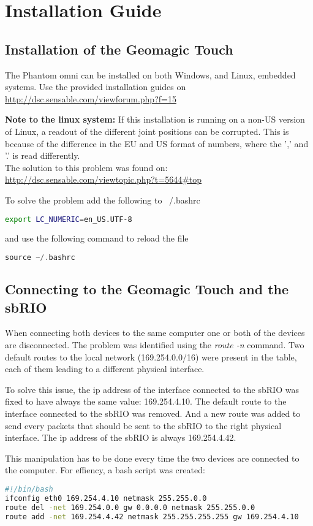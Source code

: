 \chapter{Installation Guide}

\section{Installation of the Geomagic Touch}
The Phantom omni can be installed on both Windows, and Linux, embedded systems. 
Use the provided installation guides on\\
\url{http://dsc.sensable.com/viewforum.php?f=15}

\textbf{Note to the linux system:} If this installation is running on a non-US version of Linux, a readout of the different joint positions can be corrupted. This is because of the difference in the EU and US format of numbers, where the ',' and '.' is read differently.\\
The solution to this problem was found on:\\
\url{http://dsc.sensable.com/viewtopic.php?t=5644#top}

To solve the problem add the following to ~/.bashrc
\begin{lstlisting}[language=bash]
export LC_NUMERIC=en_US.UTF-8
\end{lstlisting}
and use the following command to reload the file
\begin{lstlisting}[language=C]
source ~/.bashrc
\end{lstlisting}

\section{Connecting to the Geomagic Touch and the sbRIO}

When connecting both devices to the same computer one or both of the devices are disconnected. The problem was identified using the \textit{route -n} command. Two default routes to the local network (169.254.0.0/16) were present in the table, each of them leading to a different physical interface.

To solve this issue, the ip address of the interface connected to the sbRIO was fixed to have always the same value: 169.254.4.10. The default route to the interface connected to the sbRIO was removed. And a new route was added to send every packets that should be sent to the sbRIO to the right physical interface. The ip address of the sbRIO is always 169.254.4.42.

This manipulation has to be done every time the two devices are connected to the computer. For effiency, a bash script was created: 

\begin{lstlisting}[language=bash]
#!/bin/bash
ifconfig eth0 169.254.4.10 netmask 255.255.0.0
route del -net 169.254.0.0 gw 0.0.0.0 netmask 255.255.0.0
route add -net 169.254.4.42 netmask 255.255.255.255 gw 169.254.4.10
\end{lstlisting}